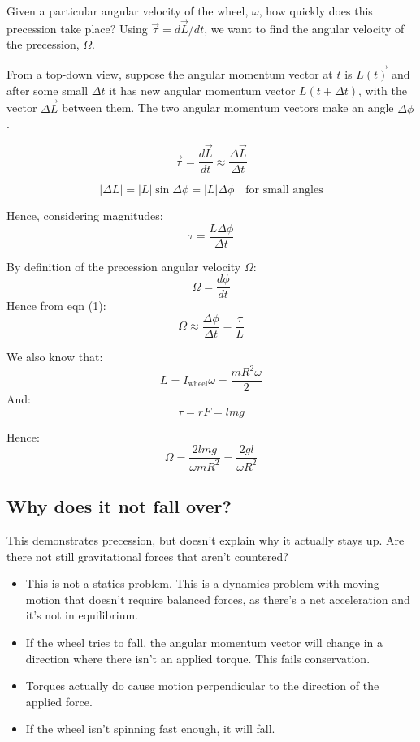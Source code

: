 Given a particular angular velocity of the wheel, $\omega$, how quickly does this precession take place? Using $\vec{\tau} = d \vec{L} / dt$, we want to find the angular velocity of the precession, $\Omega$.

From a top-down view, suppose the angular momentum vector at $t$ is $\vec{L(t)}$ and after some small $\Delta t$ it has new angular momentum vector $L(t + \Delta t)$, with the vector $\Delta \vec{L}$ between them. The two angular momentum vectors make an angle $\Delta \phi$.

\[
    \vec{\tau} = \frac{d \vec{L}}{dt} \approx \frac{\Delta \vec{L}}{\Delta t}
\]

\[
    | \Delta L | = |L| \sin \Delta \phi = |L| \Delta \phi \quad \text{for small angles}
\]

Hence, considering magnitudes:
\[
    \tau = \frac{L \Delta \phi}{\Delta t} \tag{1}
\]

By definition of the precession angular velocity $\Omega$:
\[
    \Omega = \frac{d \phi}{dt}
\]
Hence from eqn (1):
\[
    \Omega \approx \frac{\Delta \phi}{\Delta t} = \frac{\tau}{L}
\]

We also know that:
\[
    L = I_\text{wheel} \omega = \frac{mR^2\omega}{2}
\]
And:
\[
    \tau = rF = lmg
\]

Hence:
\[
    \Omega = \frac{2 lmg}{\omega mR^2} = \frac{2gl}{\omega R^2}
\]

\subsection{Why does it not fall over?}
This demonstrates precession, but doesn't explain why it actually stays up. Are there not still gravitational forces that aren't countered?

\begin{itemize}
    \item This is not a statics problem. This is a dynamics problem with moving motion that doesn't require balanced forces, as there's a net acceleration and it's not in equilibrium.
    \item If the wheel tries to fall, the angular momentum vector will change in a direction where there isn't an applied torque. This fails conservation.
    \item Torques actually do cause motion perpendicular to the direction of the applied force.
    \item If the wheel isn't spinning fast enough, it will fall.
\end{itemize}
